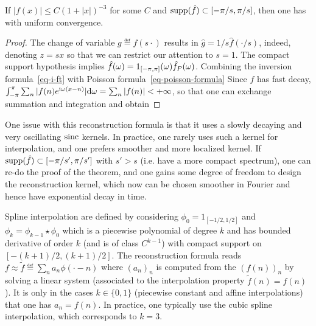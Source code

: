 




\begin{thm} \label{thm-shannon-sampling}
	If $|f(x)| \leq C(1+|x|)^{-3}$ for some $C$ and $\operatorname{supp}(\hat f) \subset [-\pi/s,\pi/s]$, then one has
	with uniform convergence.
\end{thm}

\begin{proof} 
	The change of variable $g \eqdef f(s \cdot)$ results in $\hat g=1/s \hat f(\cdot/s)$, indeed, denoting $z=s x$
	so that we can restrict our attention to $s=1$.
	The compact support hypothesis implies $\hat f(\omega) = 1_{[-\pi,\pi]}(\omega) \hat f_P(\omega)$.  
	Combining the inversion formula~\eqref{eq-i-ft} with Poisson formula~\eqref{eq-poisson-formula}
	Since $f$ has fast decay, $\int_{-\pi}^\pi \sum_n |f(n) e^{\mathrm{i} \omega (x-n)}| \mathrm{d} \omega = \sum_n |f(n)| < +\infty$, so that one can exchange summation and integration and obtain
\end{proof}

One issue with this reconstruction formula is that it uses a slowly decaying and very oscillating $\operatorname{sinc}$ kernels. In practice, one rarely uses such a kernel for interpolation, and one prefers smoother and more localized kernel. If $\operatorname{supp}(\hat f) \subset [-\pi/s',\pi/s']$ with $s'>s$ (i.e. have a more compact spectrum), one can re-do the proof of the theorem, and one gains some degree of freedom to design the reconstruction kernel, which now can be chosen smoother in Fourier and hence have exponential decay in time. 

%
Spline interpolation are defined by considering $\phi_0=1_{[-1/2,1/2]}$ and $\phi_k = \phi_{k-1} \star \phi_0$ which is a piecewise polynomial of degree $k$ and has bounded derivative of order $k$ (and is of class $C^{k-1}$) with compact support on $[-(k+1)/2,(k+1)/2]$. The reconstruction formula reads $f \approx \tilde f \eqdef \sum_n a_n \phi(\cdot-n)$ where $(a_n)_n$ is computed from the $(f(n))_n$ by solving a linear system (associated to the interpolation property $\tilde f(n)=f(n)$). It is only in the cases $k \in \{0,1\}$ (piecewise constant and affine interpolations) that one has $a_n=f(n)$.
%
In practice, one typically use the cubic spline interpolation, which corresponds to $k=3$.

